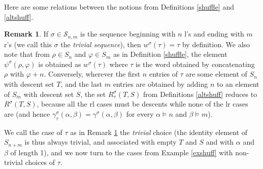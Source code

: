 \documentclass{article}
\theoremstyle{definition}
\newtheorem{rmk}[thm]{Remark}
\begin{document}
Here are some relations between the notions from Definitions \ref{shuffle} and \ref{altshuff}.
\begin{rmk}
If $\sigma\in\mathcal{S}_{n,m}$ is the sequence beginning with $n$ l's and ending with $m$ r's (we call this $\sigma$ the \emph{trivial sequence}), then $w^{\sigma}(\tau)=\tau$ by definition. We also note that from $\rho \in S_{n}$ and $\varphi \in S_{m}$ as in Definition \ref{shuffle}, the element $\psi^{\sigma}(\rho,\varphi)$ is obtained as $w^{\sigma}(\tau)$ where $\tau$ is the word obtained by concatenating $\rho$ with $\varphi+n$. Conversely, wherever the first $n$ entries of $\tau$ are some element of $S_{n}$ with descent set $T$, and the last $m$ entries are obtained by adding $n$ to an element of $S_{m}$ with descent set $S$, the set $R^{\sigma}_{\tau}(T,S)$ from Definitions \ref{altshuff} reduces to $R^{\sigma}(T,S)$, because all the rl cases must be descents while none of the lr cases are (and hence $\gamma^{\sigma}_{\tau}(\alpha,\beta)=\gamma^{\sigma}(\alpha,\beta)$ for every $\alpha \vDash n$ and $\beta \vDash m$). \label{trivtau}
\end{rmk}
We call the case of $\tau$ as in Remark \ref{trivtau} the \emph{trivial} choice (the identity element of $S_{n+m}$ is thus always trivial, and associated with empty $T$ and $S$ and with $\alpha$ and $\beta$ of length 1), and we now turn to the cases from Example \ref{exshuff} with non-trivial choices of $\tau$.
\end{document}
